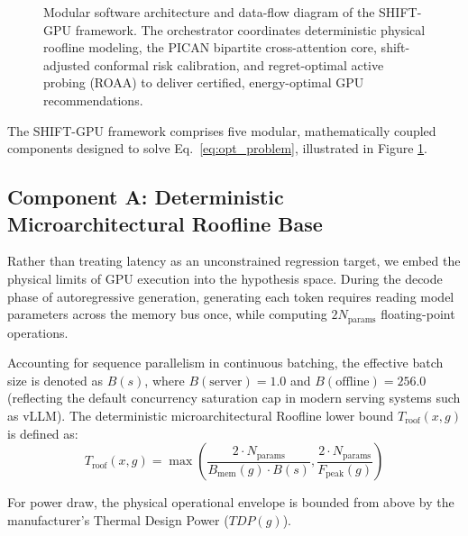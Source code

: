 \documentclass[3p,12pt]{elsarticle}
\begin{document}
\begin{figure}[t]
\caption{Modular software architecture and data-flow diagram of the SHIFT-GPU framework. The orchestrator coordinates deterministic physical roofline modeling, the PICAN bipartite cross-attention core, shift-adjusted conformal risk calibration, and regret-optimal active probing (ROAA) to deliver certified, energy-optimal GPU recommendations.}
\label{fig:architecture}
\end{figure}

The SHIFT-GPU framework comprises five modular, mathematically coupled components designed to solve Eq.~\eqref{eq:opt_problem}, illustrated in Figure \ref{fig:architecture}.

\subsection{Component A: Deterministic Microarchitectural Roofline Base}
Rather than treating latency as an unconstrained regression target, we embed the physical limits of GPU execution into the hypothesis space. During the decode phase of autoregressive generation, generating each token requires reading model parameters across the memory bus once, while computing $2 N_{\text{params}}$ floating-point operations.

Accounting for sequence parallelism in continuous batching, the effective batch size is denoted as $B(s)$, where $B(\text{server}) = 1.0$ and $B(\text{offline}) = 256.0$ (reflecting the default concurrency saturation cap in modern serving systems such as vLLM). The deterministic microarchitectural Roofline lower bound $T_{\text{roof}}(x, g)$ is defined as:
\begin{equation}
\label{eq:roofline}
T_{\text{roof}}(x, g) = \max\left( \frac{2 \cdot N_{\text{params}}}{B_{\text{mem}}(g) \cdot B(s)}, \frac{2 \cdot N_{\text{params}}}{F_{\text{peak}}(g)} \right)
\end{equation}

For power draw, the physical operational envelope is bounded from above by the manufacturer's Thermal Design Power ($TDP(g)$).
\end{document}
